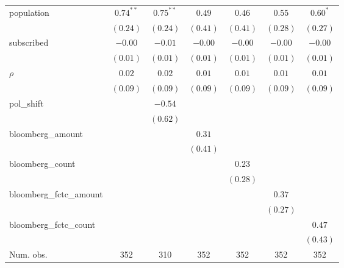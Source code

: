 \begin{table}[!h]
\begin{center}
\begin{tabular}{l c c c c c c }
population              & $0.74^{**}$  & $0.75^{**}$  & $0.49$       & $0.46$       & $0.55$       & $0.60^{*}$   \\
                        & $(0.24)$     & $(0.24)$     & $(0.41)$     & $(0.41)$     & $(0.28)$     & $(0.27)$     \\
subscribed              & $-0.00$      & $-0.01$      & $-0.00$      & $-0.00$      & $-0.00$      & $-0.00$      \\
                        & $(0.01)$     & $(0.01)$     & $(0.01)$     & $(0.01)$     & $(0.01)$     & $(0.01)$     \\
$\rho$                  & $0.02$       & $0.02$       & $0.01$       & $0.01$       & $0.01$       & $0.01$       \\
                        & $(0.09)$     & $(0.09)$     & $(0.09)$     & $(0.09)$     & $(0.09)$     & $(0.09)$     \\
pol\_shift              &              & $-0.54$      &              &              &              &              \\
                        &              & $(0.62)$     &              &              &              &              \\
bloomberg\_amount       &              &              & $0.31$       &              &              &              \\
                        &              &              & $(0.41)$     &              &              &              \\
bloomberg\_count        &              &              &              & $0.23$       &              &              \\
                        &              &              &              & $(0.28)$     &              &              \\
bloomberg\_fctc\_amount &              &              &              &              & $0.37$       &              \\
                        &              &              &              &              & $(0.27)$     &              \\
bloomberg\_fctc\_count  &              &              &              &              &              & $0.47$       \\
                        &              &              &              &              &              & $(0.43)$     \\
\midrule
Num. obs.               & 352          & 310          & 352          & 352          & 352          & 352          \\

\end{tabular}
\end{center}
\end{table}
